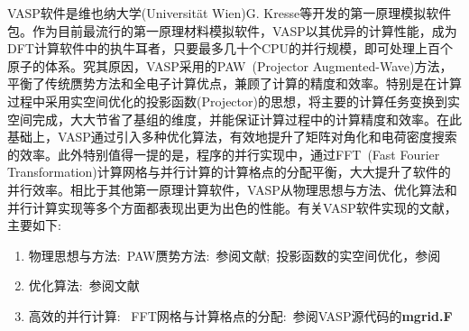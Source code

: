 \textrm{VASP}软件是维也纳大学(Universit\"at Wien)\textrm{G. Kresse}等开发的第一原理模拟软件包。作为目前最流行的第一原理材料模拟软件，\textrm{VASP}以其优异的计算性能，成为\textrm{DFT}计算软件中的执牛耳者，只要最多几十个\textrm{CPU}的并行规模，即可处理上百个原子的体系。究其原因，\textrm{VASP}采用的\textrm{PAW~(Projector Augmented-Wave)}方法，平衡了传统赝势方法和全电子计算优点，兼顾了计算的精度和效率。特别是在计算过程中采用实空间优化的投影函数\textrm{(Projector)}的思想，将主要的计算任务变换到实空间完成，大大节省了基组的维度，并能保证计算过程中的计算精度和效率。在此基础上，\textrm{VASP}通过引入多种优化算法，有效地提升了矩阵对角化和电荷密度搜索的效率。此外特别值得一提的是，程序的并行实现中，通过\textrm{FFT~(Fast Fourier Transformation)}计算网格与并行计算的计算格点的分配平衡，大大提升了软件的并行效率。相比于其他第一原理计算软件，\textrm{VASP}从物理思想与方法、优化算法和并行计算实现等多个方面都表现出更为出色的性能。有关\textrm{VASP}软件实现的文献，主要如下:~
\begin{enumerate}
	\item 物理思想与方法:~\textrm{PAW}赝势方法:~参阅文献\cite{PRB50-17953_1994,PRB59-1758_1999};~投影函数的实空间优化，参阅\cite{JPCM6-8245_1994,PRB44-13063_1991,PRB44-8503_1991}
	\item 优化算法:~参阅文献\cite{CMS6-15_1996,PRB54-11169_1996}
	\item 高效的并行计算:~ \textrm{FFT}网格与计算格点的分配:~参阅\textrm{VASP}源代码的\textbf{mgrid.F}
\end{enumerate}

